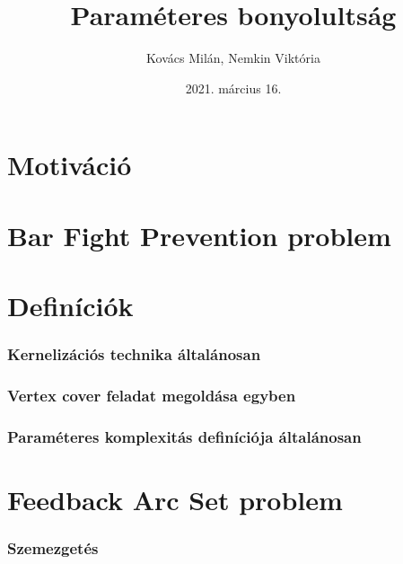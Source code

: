 \documentclass[aspectratio=169]{beamer}
\begin{document}
\title{Paraméteres bonyolultság}
\author{Kovács Milán, Nemkin Viktória}
\date{2021. március 16.}

\frame{\titlepage}


\section{Motiváció}






\section{Bar Fight Prevention problem}









\section{Definíciók}

\begin{frame}
\frametitle{Kernelizációs technika általánosan}
\end{frame}


\begin{frame}
\frametitle{Vertex cover feladat megoldása egyben}
\end{frame}

\begin{frame}
\frametitle{Paraméteres komplexitás definíciója általánosan}
\end{frame}

\section{Feedback Arc Set problem}

\begin{frame}
\frametitle{Szemezgetés}
\end{frame}
\end{document}
